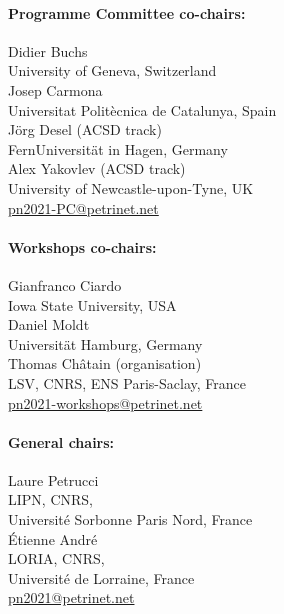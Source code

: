 \documentclass[10pt,a4paper]{article}
\newcommand{\styleUniv}[1]{\textcolor{black!75}{#1}}
\begin{document}
\vspace*{-1em}
\setlength{\columnsep}{-5cm}
\begin{multicols}{2}
\paragraph*{Programme Committee co-chairs:}\mbox{}

\noindent Didier Buchs \\
\indent \styleUniv{University of Geneva, Switzerland} \\
\noindent Josep Carmona \\
\indent \styleUniv{Universitat Politècnica de Catalunya, Spain} \\
\noindent Jörg Desel (ACSD track) \\
\indent \styleUniv{FernUniversität in Hagen, Germany} \\
\noindent Alex Yakovlev (ACSD track) \\
\indent \styleUniv{University of Newcastle-upon-Tyne, UK} \\
\href{mailto:pn2021-PC@petrinet.net}{pn2021-PC@petrinet.net}

\vspace*{-0.5em}
\paragraph*{Workshops co-chairs:}\mbox{}

\noindent Gianfranco Ciardo \\
\indent \styleUniv{Iowa State University, USA} \\
\noindent Daniel Moldt \\
\indent \styleUniv{Universität Hamburg, Germany} \\
\noindent Thomas Châtain (organisation) \\
\indent \styleUniv{LSV, CNRS, ENS Paris-Saclay, France} \\
\href{mailto:pn2021-WT@petrinet.net}{pn2021-workshops@petrinet.net}

\vspace*{-0.5em}
\paragraph*{General chairs:}\mbox{}

\noindent Laure Petrucci \\
\indent \styleUniv{LIPN, CNRS, \\ \indent Université Sorbonne Paris Nord, France}\\
\noindent Étienne André \\
\indent \styleUniv{LORIA, CNRS, \\ \indent Université de Lorraine, France} \\
\href{mailto:pn2021@petrinet.net}{pn2021@petrinet.net}


\end{multicols}
\end{document}
